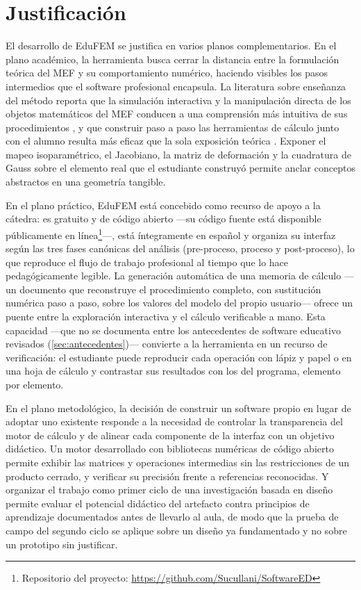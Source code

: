 \section*{Justificación}

El desarrollo de EduFEM se justifica en varios planos complementarios. En el plano académico, la herramienta busca cerrar la distancia entre la formulación teórica del MEF y su comportamiento numérico, haciendo visibles los pasos intermedios que el software profesional encapsula. La literatura sobre enseñanza del método reporta que la simulación interactiva y la manipulación directa de los objetos matemáticos del MEF conducen a una comprensión más intuitiva de sus procedimientos \autocites[p.~157]{lee2015interactive}[pp.~872, 874]{lee2015eigenmodes}, y que construir paso a paso las herramientas de cálculo junto con el alumno resulta más eficaz que la sola exposición teórica \autocite[p.~17]{bishay2020teaching}. Exponer el mapeo isoparamétrico, el Jacobiano, la matriz de deformación y la cuadratura de Gauss sobre el elemento real que el estudiante construyó permite anclar conceptos abstractos en una geometría tangible.

En el plano práctico, EduFEM está concebido como recurso de apoyo a la cátedra: es gratuito y de código abierto —su código fuente está disponible públicamente en línea\footnote{Repositorio del proyecto: \url{https://github.com/Sucullani/SoftwareED}}—, está íntegramente en español y organiza su interfaz según las tres fases canónicas del análisis (pre-proceso, proceso y post-proceso), lo que reproduce el flujo de trabajo profesional al tiempo que lo hace pedagógicamente legible. La generación automática de una memoria de cálculo —un documento que reconstruye el procedimiento completo, con sustitución numérica paso a paso, sobre los valores del modelo del propio usuario— ofrece un puente entre la exploración interactiva y el cálculo verificable a mano. Esta capacidad —que no se documenta entre los antecedentes de software educativo revisados (\autoref{sec:antecedentes})— convierte a la herramienta en un recurso de verificación: el estudiante puede reproducir cada operación con lápiz y papel o en una hoja de cálculo y contrastar sus resultados con los del programa, elemento por elemento.

En el plano metodológico, la decisión de construir un software propio en lugar de adoptar uno existente responde a la necesidad de controlar la transparencia del motor de cálculo y de alinear cada componente de la interfaz con un objetivo didáctico. Un motor desarrollado con bibliotecas numéricas de código abierto \autocite{harris2020numpy,virtanen2020scipy} permite exhibir las matrices y operaciones intermedias sin las restricciones de un producto cerrado, y verificar su precisión frente a referencias reconocidas. Y organizar el trabajo como primer ciclo de una investigación basada en diseño permite evaluar el potencial didáctico del artefacto contra principios de aprendizaje documentados antes de llevarlo al aula, de modo que la prueba de campo del segundo ciclo se aplique sobre un diseño ya fundamentado y no sobre un prototipo sin justificar.

